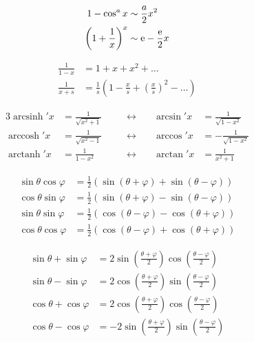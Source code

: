 \documentclass{../mathnotes-art}
\DeclareMathOperator{\arccosh}{arccosh}
\DeclareMathOperator{\arcsinh}{arcsinh}
\DeclareMathOperator{\arctanh}{arctanh}
\begin{document}
\begin{align*}
    1 - \cos^{a} x &\sim \frac{a}{2}x^{2}\\
    \left( 1+\frac{1}{x} \right)^{x} &\sim \mathrm{e} - \frac{\mathrm{e}}{2}x
\end{align*}

\begin{align*}
    \frac{1}{1 - x} &= 1 + x + x^{2} + \dots\\
    \frac{1}{x + s} &= \frac{1}{s}\left( 1 - \frac{x}{s} +
    \left( \frac{x}{s} \right)^{2} - \dots \right)
\end{align*}

\begin{alignat*}{3}
    \arcsinh'x & =\frac{1}{\sqrt{x^{2}+1}} & \quad &
    \longleftrightarrow \quad & \arcsin'x &
    =\frac{1}{\sqrt{1-x^{2}}}  \\
    \arccosh'x & =\frac{1}{\sqrt{x^{2}-1}} &       &
    \longleftrightarrow       & \arccos'x &
    =-\frac{1}{\sqrt{1-x^{2}}} \\
    \arctanh'x & =\frac{1}{1-x^{2}}        &       &
    \longleftrightarrow       & \arctan'x & =\frac{1}{x^{2}+1}
\end{alignat*}

\begin{align*}
    \sin \theta \cos \varphi & = \frac{1}{2}\left( \sin(\theta + \varphi) +
    \sin(\theta - \varphi) \right) \\
    \cos \theta \sin \varphi & = \frac{1}{2}\left( \sin(\theta + \varphi) -
    \sin(\theta - \varphi) \right) \\
    \sin \theta \sin \varphi & = \frac{1}{2}\left( \cos(\theta - \varphi) -
    \cos(\theta + \varphi) \right) \\
    \cos \theta \cos \varphi & = \frac{1}{2}\left( \cos(\theta - \varphi) + \cos(\theta + \varphi) \right)
\end{align*}

\begin{align*}
    \sin \theta + \sin \varphi & = 2 \sin \left( \frac{\theta +
    \varphi}{2} \right) \cos \left( \frac{\theta -
    \varphi}{2} \right)  \\
    \sin \theta - \sin \varphi & = 2 \cos \left( \frac{\theta +
    \varphi}{2} \right) \sin \left( \frac{\theta -
    \varphi}{2} \right)  \\
    \cos \theta + \cos \varphi & = 2 \cos \left( \frac{\theta +
    \varphi}{2} \right) \cos \left( \frac{\theta -
    \varphi}{2} \right)  \\
    \cos \theta - \cos \varphi & = -2 \sin \left( \frac{\theta +
    \varphi}{2} \right) \sin \left( \frac{\theta - \varphi}{2} \right)
\end{align*}
\end{document}
